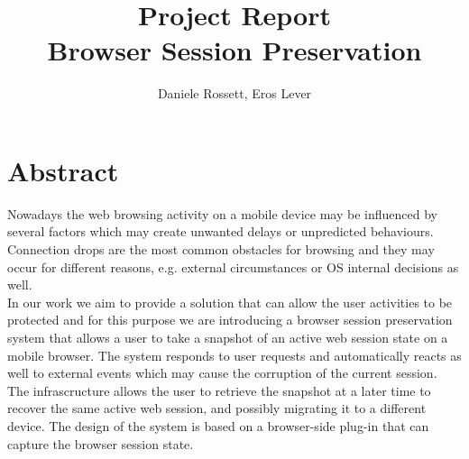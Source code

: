 \documentclass[11pt,a4paper]{article}
\title{\textbf{Project Report}\\Browser Session Preservation}
\author{Daniele Rossett, Eros Lever}
\begin{document}
\maketitle
\section{Abstract}
Nowadays the web browsing activity on a mobile device may be influenced by several factors which may create unwanted delays or unpredicted behaviours. Connection drops are the most common obstacles for browsing and they may occur for different reasons, e.g. external circumstances or OS internal decisions as well.\\
In our work we aim to provide a solution that can allow the user activities to be protected and for this purpose we are introducing a browser session preservation system that allows a user to take a snapshot of an active web session state on a mobile browser. The system responds to user requests and automatically reacts as well to external events which may cause the corruption of the current session.\\
The infrascructure allows the user to retrieve the snapshot at a later time to recover the same active web session, and possibly migrating it to a different device. The design of the system is based on a browser-side plug-in that can capture the browser session state.
\end{document}
